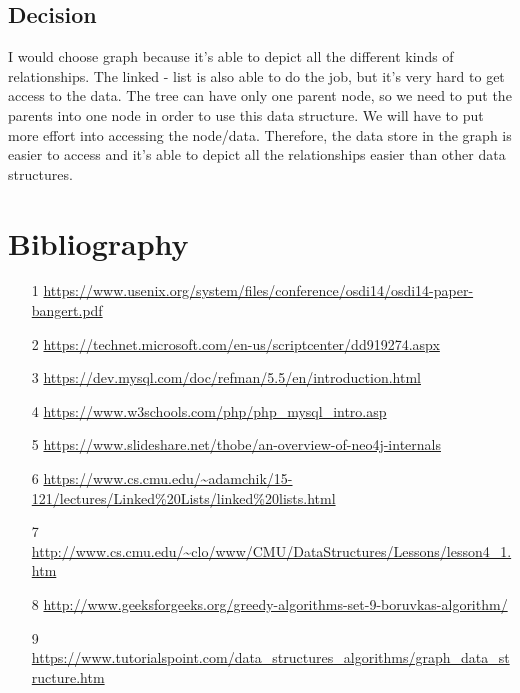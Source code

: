 \documentclass[onecolumn, draftclsnofoot, 10pt, compsoc]{IEEEtran}
\begin{document}
\subsection{Decision}
\begin{singlespace}
I would choose graph because it's able to depict all the different kinds of relationships. The linked - list is also able to do the job, but it's very hard to get access to the data. The tree can have only one parent node, so we need to put the parents into one node in order to use this data structure. We will have to put more effort into accessing the node/data. Therefore, the data store in the graph is easier to access and it's able to depict all the relationships easier than other data structures.   
\end{singlespace}
\section{Bibliography}
\begin{itemize}
  \item [1] \url{https://www.usenix.org/system/files/conference/osdi14/osdi14-paper-bangert.pdf}
  \item [2] \url{https://technet.microsoft.com/en-us/scriptcenter/dd919274.aspx}
  \item [3] \url{https://dev.mysql.com/doc/refman/5.5/en/introduction.html}
  \item [4] \url{https://www.w3schools.com/php/php_mysql_intro.asp}
  \item [5] \url{https://www.slideshare.net/thobe/an-overview-of-neo4j-internals}
  \item [6] \url{https://www.cs.cmu.edu/~adamchik/15-121/lectures/Linked%20Lists/linked%20lists.html}
  \item [7] \url{http://www.cs.cmu.edu/~clo/www/CMU/DataStructures/Lessons/lesson4_1.htm}
  \item [8] \url{http://www.geeksforgeeks.org/greedy-algorithms-set-9-boruvkas-algorithm/}
  \item [9] \url{https://www.tutorialspoint.com/data_structures_algorithms/graph_data_structure.htm}
\end{itemize}
\end{document}
